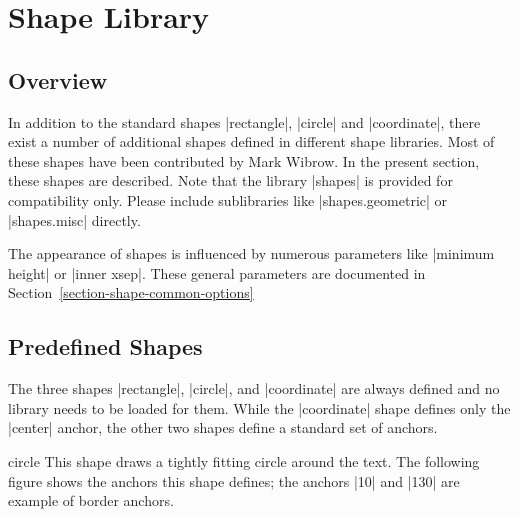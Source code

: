 %
%
%


\section{Shape Library}
\label{section-libs-shapes}


\subsection{Overview}

In addition to the standard shapes |rectangle|, |circle| and
|coordinate|, there exist a number of additional shapes defined in
different shape libraries. Most of these shapes have been 
contributed by Mark Wibrow. In the present section, these shapes are
described. Note that the library |shapes| is provided for
compatibility only. Please include sublibraries like
|shapes.geometric| or |shapes.misc| directly.

The appearance of shapes is influenced by numerous parameters like
|minimum height| or |inner xsep|. These general parameters are documented in
Section~\ref{section-shape-common-options} 


\subsection{Predefined Shapes}
\label{section-predefined-shapes}

The three shapes |rectangle|, |circle|, and |coordinate| are always
defined and no library needs to be loaded for them. While the
|coordinate| shape defines only the |center| anchor, the other two
shapes define a standard set of anchors.

\begin{shape}{circle}
  This shape draws a tightly fitting circle around the text. The
  following figure shows the anchors this shape defines; the anchors
  |10| and |130| are example of border anchors. 
\begin{codeexample}[]
\Huge
{}
\end{codeexample}
\end{shape}

